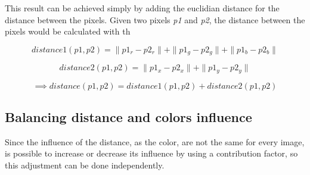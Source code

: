 \documentclass{article}
\begin{document}
This result can be achieved simply by adding the euclidian distance for the distance between the pixels. Given two pixels \emph{p1} and \emph{p2}, the distance between the pixels would be calculated with th

\[
distance1(p1,p2)=\|p1_r-p2_r\|+\|p1_g-p2_g\|+\|p1_b-p2_b\|
\]

\[
distance2(p1,p2)=\|p1_x-p2_x\|+\|p1_y-p2_y\|
\]

\[
\implies distance(p1,p2)=distance1(p1,p2)+distance2(p1,p2)
\]

\subsection{Balancing distance and colors influence}

Since the influence of the distance, as the color, are not the same for every image, is possible to increase or decrease its influence by using a contribution factor, so this adjustment can be done independently.
\end{document}
